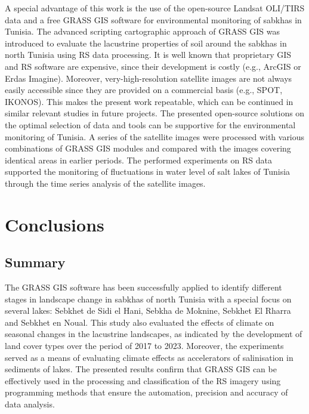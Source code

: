 \documentclass[land,article,accept,pdftex,moreauthors]{Definitions/mdpi}
\begin{document}
{A }special advantage of this work is the use of the open-source Landsat OLI/TIRS data and a free GRASS GIS software {for  environmental monitoring of sabkhas in Tunisia}. {The advanced scripting cartographic approach of GRASS GIS} was introduced to evaluate the lacustrine properties of soil around the sabkhas in north Tunisia using RS data processing. It is well known that proprietary GIS and RS software are expensive, since their development is costly (e.g., ArcGIS or Erdas Imagine). Moreover, very-high-resolution satellite images are not always easily accessible since they are provided on a commercial basis (e.g., SPOT, IKONOS). This makes the present work repeatable, which can be continued in similar relevant studies in future projects. The presented open-source solutions on the optimal selection of data and tools can be supportive for the environmental monitoring  of Tunisia. {A }series of the satellite images were processed with various combinations of GRASS GIS modules and compared with the images covering identical areas in earlier periods{. }The performed experiments on RS data supported the monitoring of fluctuations in water level of salt lakes of Tunisia through the time series analysis of {the }satellite images. 

\section{Conclusions}

\subsection{Summary}

{The }GRASS GIS software has been successfully applied to identify different stages {in }landscape change in sabkhas of north Tunisia {with} a special focus on several lakes: Sebkhet de Sidi el Hani, Sebkha de Moknine, Sebkhet El Rharra and Sebkhet en Noual{. }This study also evaluated the effects of climate on seasonal changes in the lacustrine landscapes, as indicated by {the }development of land cover types over the period of {2017 to 2023}. Moreover, the experiments served as a means of evaluating {climate} effects as accelerators of salinisation{ in }sediments of lakes. The presented results confirm that GRASS GIS can be effectively used in the processing and classification of {the }RS imagery using programming {methods} that ensure the automation{, }precision and accuracy of data {analysis}. 
\end{document}
